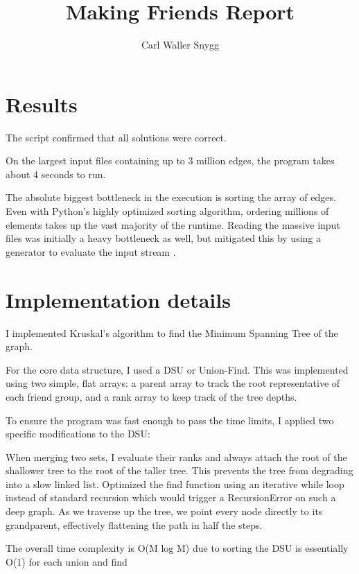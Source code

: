 \documentclass{article}
\title{Making Friends Report}
\author{Carl Waller Snygg}
\begin{document}
  \maketitle

  \section{Results}
  
  The script confirmed that all solutions were correct. 

  On the largest input files containing up to 3 million edges, the program takes about 4 seconds to run. 

  The absolute biggest bottleneck in the execution is sorting the array of edges. Even with Python's highly optimized sorting algorithm, ordering millions of elements takes up the vast majority of the runtime. Reading the massive input files was initially a heavy bottleneck as well, but mitigated this by using a generator to evaluate the input stream .

  \section{Implementation details}

  I implemented Kruskal's algorithm to find the Minimum Spanning Tree of the graph. 

  For the core data structure, I used a DSU or Union-Find. This was implemented using two simple, flat arrays: a parent array to track the root representative of each friend group, and a rank array to keep track of the tree depths. 

  To ensure the program was fast enough to pass the time limits, I applied two specific modifications to the DSU:
  
  When merging two sets, I evaluate their ranks and always attach the root of the shallower tree to the root of the taller tree. This prevents the tree from degrading into a slow linked list.
  Optimized the find function using an iterative while loop instead of standard recursion which would trigger a RecursionError on such a deep graph. As we traverse up the tree, we point every node directly to its grandparent, effectively flattening the path in half the steps.
  

  The overall time complexity is O(M log M) due to sorting the DSU is essentially O(1) for each union and find 
\end{document}
